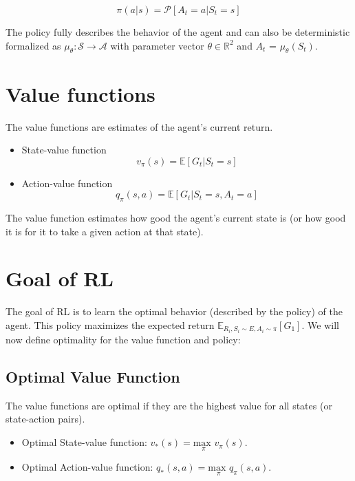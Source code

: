 \begin{equation}
    \pi(a|s) = \mathcal{P}[A_t = a \vert S_t = s]
    \label{eq:policy}
\end{equation}

The policy fully describes the behavior of the agent and can also be deterministic formalized as
$\mu_\theta : \mathcal{S} \rightarrow \mathcal{A}$ with parameter vector $\theta \in  \mathbb{R}^2$ and
$A_t$ = $\mu_\theta(S_t)$.

\section{Value functions}

The value functions are estimates of the agent's current return.

\begin{itemize}
    \item State-value function 
    \begin{equation}
        v_\pi(s) = \mathbb{E}[G_t \vert S_t = s]
    \end{equation}

    \item Action-value function
    \begin{equation}
        q_\pi(s, a) = \mathbb{E}[G_t \vert S_t = s, A_t = a]
    \end{equation}
\end{itemize}

The value function estimates how good the agent's current state is (or how good it is for it to take a given action at that state).

\section{Goal of RL}

The goal of RL is to learn the optimal behavior (described by the policy) of the agent. This policy maximizes
the expected return $\mathbb{E}_{R_i, S_i \sim E, A_i \sim \pi} [G_1]$.
We will now define optimality for the value function and policy:

\subsection{Optimal Value Function}

The value functions are optimal if they are the highest value for all states (or state-action pairs).

\begin{itemize}
    \item Optimal State-value function: $v_*(s) = \underset{\pi}{\textrm{max }} v_\pi(s)$.
    \item Optimal Action-value function: $q_*(s, a) = \underset{\pi}{\textrm{max }} q_\pi(s, a)$.
\end{itemize}

